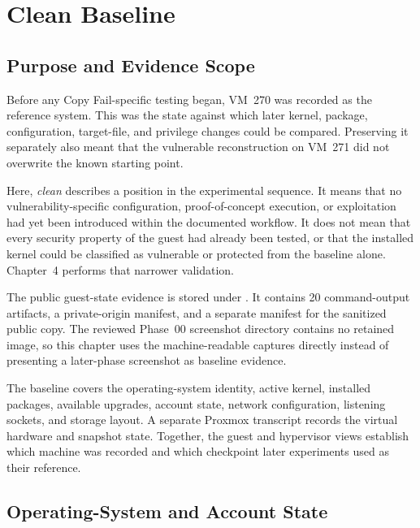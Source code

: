 \section{Clean Baseline}
\label{sec:clean-baseline}

\subsection{Purpose and Evidence Scope}

Before any Copy Fail-specific testing began, VM~270
 was recorded as the reference system. This was the state
against which later kernel, package, configuration, target-file, and privilege
changes could be compared. Preserving it separately also meant that the
vulnerable reconstruction on VM~271 did not overwrite the known starting
point.

Here, \emph{clean} describes a position in the experimental sequence. It means
that no vulnerability-specific configuration, proof-of-concept execution, or
exploitation had yet been introduced within the documented workflow. It does
not mean that every security property of the guest had already been tested, or
that the installed kernel could be classified as vulnerable or protected from
the baseline alone. Chapter~4 performs that narrower validation.

\begin{evidencebox}
The public guest-state evidence is stored under
. It contains 20 command-output artifacts, a
private-origin manifest, and a separate manifest for the sanitized public
copy. The reviewed Phase~00 screenshot directory contains no retained image,
so this chapter uses the machine-readable captures directly instead of
presenting a later-phase screenshot as baseline evidence.
\end{evidencebox}

The baseline covers the operating-system identity, active kernel, installed
packages, available upgrades, account state, network configuration, listening
sockets, and storage layout. A separate Proxmox transcript records the virtual
hardware and snapshot state. Together, the guest and hypervisor views establish
which machine was recorded and which checkpoint later experiments used as
their reference.

\subsection{Operating-System and Account State}

